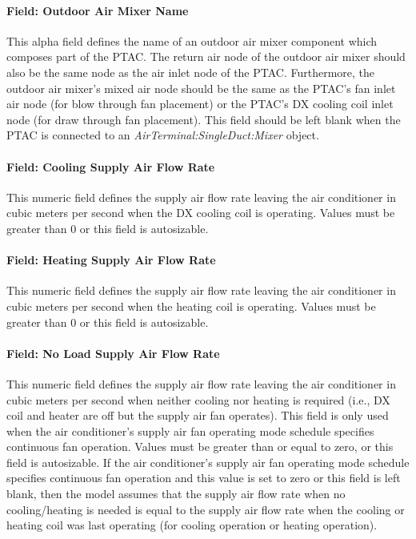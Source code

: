 \paragraph{Field: Outdoor Air Mixer Name}\label{field-outdoor-air-mixer-name-2}

This alpha field defines the name of an outdoor air mixer component which composes part of the PTAC. The return air node of the outdoor air mixer should also be the same node as the air inlet node of the PTAC. Furthermore, the outdoor air mixer's mixed air node should be the same as the PTAC's fan inlet air node (for blow through fan placement) or the PTAC's DX cooling coil inlet node (for draw through fan placement). This field should be left blank when the PTAC is connected to an \textit{AirTerminal:SingleDuct:Mixer} object.

\paragraph{Field: Cooling Supply Air Flow Rate}\label{field-cooling-supply-air-flow-rate-002}

This numeric field defines the supply air flow rate leaving the air conditioner in cubic meters per second when the DX cooling coil is operating. Values must be greater than 0 or this field is autosizable.

\paragraph{Field: Heating Supply Air Flow Rate}\label{field-heating-supply-air-flow-rate-002}

This numeric field defines the supply air flow rate leaving the air conditioner in cubic meters per second when the heating coil is operating. Values must be greater than 0 or this field is autosizable.

\paragraph{Field: No Load Supply Air Flow Rate}\label{field-no-load-supply-air-flow-rate-001}

This numeric field defines the supply air flow rate leaving the air conditioner in cubic meters per second when neither cooling nor heating is required (i.e., DX coil and heater are off but the supply air fan operates). This field is only used when the air conditioner's supply air fan operating mode schedule specifies continuous fan operation. Values must be greater than or equal to zero, or this field is autosizable. If the air conditioner's supply air fan operating mode schedule specifies continuous fan operation and this value is set to zero or this field is left blank, then the model assumes that the supply air flow rate when no cooling/heating is needed is equal to the supply air flow rate when the cooling or heating coil was last operating (for cooling operation or heating operation).

